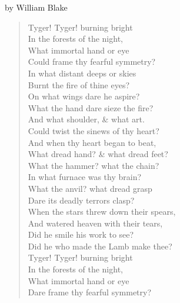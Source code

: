 
by William Blake
\begin{verse}
Tyger! Tyger! burning bright \\
In the forests of the night, \\
What immortal hand or eye \\
Could frame thy fearful symmetry? \\

In what distant deeps or skies \\
Burnt the fire of thine eyes? \\
On what wings dare he aspire? \\
What the hand dare sieze the fire? \\

And what shoulder, {\&} what art. \\
Could twist the sinews of thy heart? \\
And when thy heart began to beat, \\
What dread hand? {\&} what dread feet? \\

What the hammer? what the chain? \\
In what furnace was thy brain? \\
What the anvil? what dread grasp \\
Dare its deadly terrors clasp? \\

When the stars threw down their spears, \\
And watered heaven with their tears, \\
Did he smile his work to see? \\
Did he who made the Lamb make thee? \\

Tyger! Tyger! burning bright \\
In the forests of the night, \\
What immortal hand or eye \\
Dare frame thy fearful symmetry? \\
\end{verse}
